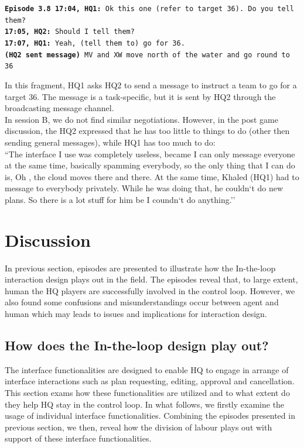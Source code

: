 \noindent\texttt{\textbf{Episode 3.8 }
\textbf{17:04, HQ1: } Ok this one (refer to target 36). Do you tell them? \\
\textbf{17:05, HQ2: } Should I tell them? \\
\textbf{17:07, HQ1: } Yeah, (tell them to) go for 36. \\
\textbf{(HQ2 sent message) } MV and XW  move north of the water and go round to 36\\
}

In this fragment, HQ1 asks HQ2 to send a message to instruct a team to go for a target 36. The message is a task-specific, but it is sent by HQ2 through the broadcasting message channel.\\

In session B, we do not find similar negotiations. However, in the post game discussion, the HQ2 expressed that he has too little to things to do (other then sending general messages), while HQ1 has too much to do:\\

``The interface I use was completely useless, became I can only message everyone at the same time, basically spamming everybody, so the only thing that I can do is, Oh , the cloud moves there and there. At the same time, Khaled (HQ1) had to message to everybody privately. While he was doing that, he couldn`t do new plans. So there is a lot stuff for him be I coundn`t do anything.''\\

\section{Discussion}\label{sec:study3discussion}

In previous section, episodes are presented to illustrate how the In-the-loop interaction design plays out in the field.  The episodes reveal that, to large extent, human the HQ players are successfully involved in the control loop. However, we also found some confusions and misunderstandings occur between agent and human which may leads to issues and implications for interaction design.  \\

\subsection{How does the In-the-loop design play out?}
The interface functionalities are designed to enable HQ to engage in arrange of interface interactions such as plan requesting, editing, approval and cancellation. This section exams how these functionalities are utilized and to what extent do they help HQ stay in the control loop. In what follows, we firstly examine the usage of individual interface functionalities. Combining the episodes presented in previous section, we then, reveal how the division of labour plays out with support of these interface functionalities.  \\

